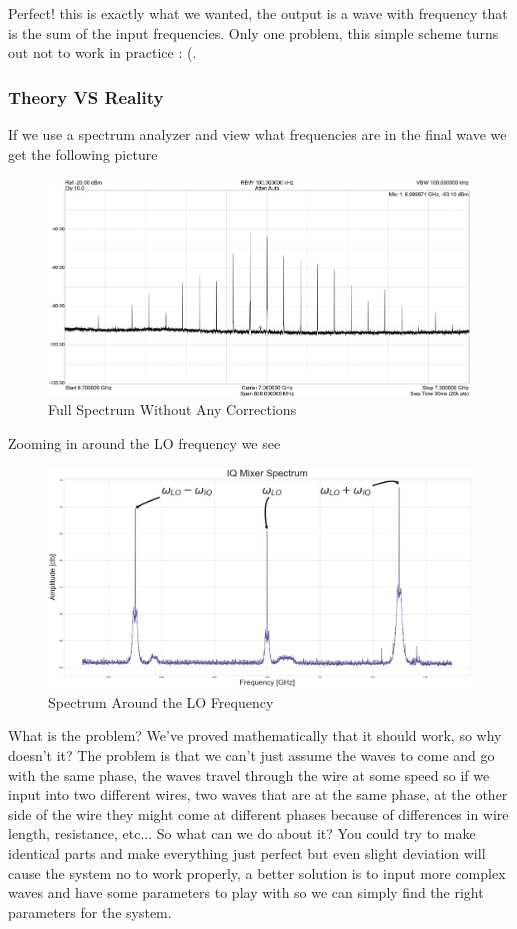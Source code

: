 Perfect! this is exactly what we wanted, the output is a wave with frequency that is the sum of the input frequencies. Only one problem, this simple scheme turns out not to work in practice : (.

\subsubsection{Theory VS Reality} \label{sec:solution_real_world} %
If we use a spectrum analyzer and view what frequencies are in the final wave we get the following picture

\begin{figure}[H]
    \centering
    \includegraphics[width=0.8\columnwidth]{full-spectrum-no-correction.jpg} %
    \caption{Full Spectrum Without Any Corrections}
    \label{fig:Full-spectrum-no-corrections}
\end{figure}
Zooming in around the LO frequency we see
\begin{figure}[H]
    \centering
    \includegraphics[width=0.9\columnwidth]{Important-Spectrum-no-correction2.png} 
    \caption{Spectrum Around the LO Frequency}
    \label{fig:closeup-spectrum-no-corrections}
\end{figure}

What is the problem? We've proved mathematically that it should work, so why doesn't it? The problem is that we can't just assume the waves to come and go with the same phase, the waves travel through the wire at some speed so if we input into two different wires, two waves that are at the same phase, at the other side of the wire they might come at different phases because of differences in wire length, resistance, etc... So what can we do about it? You could try to make identical parts and make everything just perfect but even slight deviation will cause the system no to work properly, a better solution is to input more complex waves and have some parameters to play with so we can simply find the right parameters for the system.%

